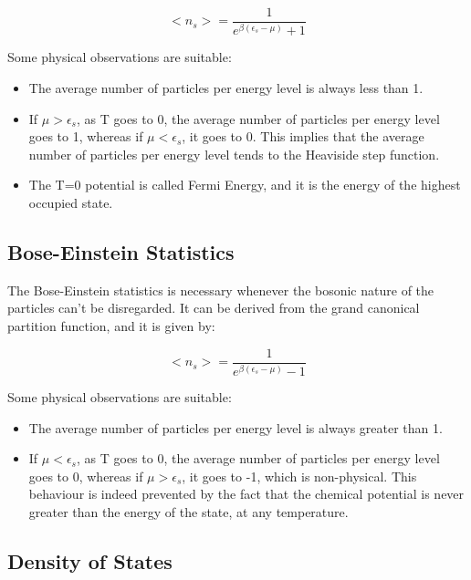 \documentclass{article}
\begin{document}
\begin{equation}
    <n_s>=\frac{1}{e^{\beta(\epsilon_s-\mu)}+1}
\end{equation}

Some physical observations are suitable:

\begin{itemize}
    \item The average number of particles per energy level is always less than 1.
    \item If $\mu>\epsilon_s$, as T goes to 0, the average number of particles per energy level goes to 1,
          whereas if $\mu<\epsilon_s$, it goes to 0. This implies that the average number of particles per energy level tends to
          the Heaviside step function.
    \item The T=0 potential is called Fermi Energy, and it is the energy of the highest occupied state.
\end{itemize}

\subsection{Bose-Einstein Statistics}

The Bose-Einstein statistics is necessary whenever the bosonic nature of the particles
can't be disregarded.
It can be derived from the grand canonical partition function, and it is given by:

\begin{equation}
    <n_s>=\frac{1}{e^{\beta(\epsilon_s-\mu)}-1}
\end{equation}

Some physical observations are suitable:

\begin{itemize}
    \item The average number of particles per energy level is always greater than 1.
    \item If $\mu<\epsilon_s$, as T goes to 0, the average number of particles per energy level goes to 0,
          whereas if $\mu>\epsilon_s$, it goes to -1, which is non-physical. This behaviour is indeed prevented by
          the fact that the chemical potential is never greater than the energy of the state, at any temperature.
\end{itemize}


\subsection{Density of States}
\end{document}

